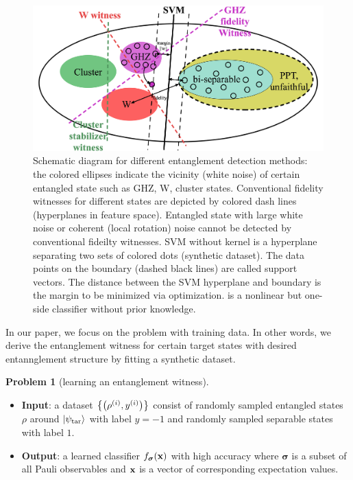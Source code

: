 \documentclass[
aps,
pra,
twocolumn,
floatfix,
]{revtex4-2}
\theoremstyle{plain}
\theoremstyle{definition}
\newtheorem{problem}{Problem}
\newcommand{\dm}{\rho}
\newcommand{\target}{\textup{tar}}
\newcommand{\bmsigma}{\bm{\sigma}}
\begin{document}
\begin{figure}[!ht]
	\centering
		\centering
		\includegraphics[width=.6\linewidth]{schematic_entangle.png}
	\caption{Schematic diagram for different entanglement detection methods: the colored ellipses indicate the vicinity (white noise) of certain entangled state such as GHZ, W, cluster states. Conventional fidelity witnesses for different states are depicted by colored dash lines (hyperplanes in feature space). Entangled state with large white noise or coherent (local rotation) noise cannot be detected by conventional fideilty witnesses. SVM without kernel is a hyperplane separating two sets of colored dots (synthetic dataset). The data points on the boundary (dashed black lines) are called support vectors. The distance between the SVM hyperplane and boundary is the margin to be minimized via optimization.  is a nonlinear but one-side classifier without prior knowledge.}
	\label{fig:entangle}
\end{figure}

In our paper, we focus on the problem  with training data.
In other words, we derive the entanglement witness for certain target states with desired entannglement structure by fitting a synthetic dataset.
\begin{problem}[learning an entanglement witness]\label{prm:learn_witness}
	\;
	\begin{itemize}
		\item \textbf{Input}: a dataset $\qty{\qty(\dm^{(i)},y^{(i)})}$ consist of randomly sampled entangled states $\dm$ around $\ket{\psi_{\target}}$ with label $y=-1$ and randomly sampled separable states with label $1$.
		\item \textbf{Output}: a learned classifier $f_{\bmsigma}(\vbx)$ with high accuracy where $\bmsigma$ is a subset of all Pauli observables and $\vb{x}$ is a vector of corresponding expectation values.
	\end{itemize}
\end{problem}
\end{document}
